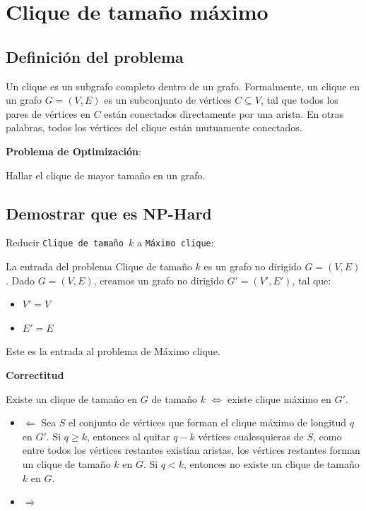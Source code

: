 \documentclass{article}
\begin{document}
\section{Clique de tamaño máximo}

    \subsection{Definición del problema}
    Un clique es un subgrafo completo dentro de un grafo. Formalmente, un clique en un grafo $G=(V,E)$ es un subconjunto de vértices $C \subseteq V$, tal que todos los pares de vértices en $C$ están conectados directamente por una arista. En otras palabras, todos los vértices del clique están mutuamente conectados.

    \textbf{Problema de Optimización}:
    
    Hallar el clique de mayor tamaño en un grafo.
    

\subsection{Demostrar que es NP-Hard}
Reducir \texttt{Clique de tamaño \(k\)} a \texttt{Máximo clique}:

La entrada del problema Clique de tamaño \(k\) es un grafo no dirigido $G=(V,E)$. Dado $G=(V,E)$, creamos un grafo no dirigido $G'=(V',E')$, tal que:
\begin{itemize}
    \item \(V' = V \)
    \item \(E' = E \)
\end{itemize}
Este es la entrada al problema de Máximo clique. 


\textbf{Correctitud}

Existe un clique de tamaño en \( G \) de tamaño \(k\) \(\iff\) existe clique máximo en \( G' \).

\begin{itemize}

\item \(\Leftarrow\)
Sea \(S\) el conjunto de vértices que forman el clique máximo de longitud \(q\) en \(G'\). Si \( q \geq k\), entonces al quitar \(q-k\) vértices cualesquieras de \(S\), como entre todos los vértices restantes existían aristas, los vértices restantes forman un clique de tamaño \(k\) en \(G\). Si \(q < k\), entonces no existe un clique de tamaño \(k\) en \(G\).

\item \(\Rightarrow\) 

\end{itemize}
\end{document}
